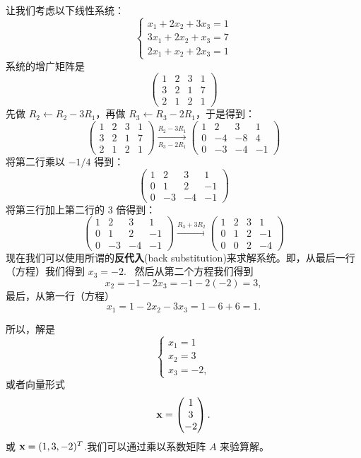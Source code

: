 让我们考虑以下线性系统：
$$
\begin{cases}
x_1 + 2x_2 + 3x_3 = 1 \\
3x_1 + 2x_2 + x_3 = 7 \\
2x_1 + x_2 + 2x_3 = 1
\end{cases}
$$
系统的增广矩阵是
$$
\left(\begin{array}{ccc|c} 1 & 2 & 3 & 1 \\ 3 & 2 & 1 & 7 \\ 2 & 1 & 2 & 1 \end{array}\right)
$$
先做 $R_2\leftarrow R_2-3R_1$，再做 $R_3\leftarrow R_3-2R_1$，于是得到：
$$
\left(\begin{array}{ccc|c} 1 & 2 & 3 & 1 \\ 3 & 2 & 1 & 7 \\ 2 & 1 & 2 & 1 \end{array}\right) \xrightarrow[R_3-2R_1]{R_2-3R_1} \left(\begin{array}{ccc|c} 1 & 2 & 3 & 1 \\ 0 & -4 & -8 & 4 \\ 0 & -3 & -4 & -1 \end{array}\right)
$$
将第二行乘以 $-1/4$ 得到：
$$
\left(\begin{array}{ccc|c} 1 & 2 & 3 & 1 \\ 0 & 1 & 2 & -1 \\ 0 & -3 & -4 & -1 \end{array}\right)
$$
将第三行加上第二行的 3 倍得到：
$$
\left(\begin{array}{ccc|c} 1 & 2 & 3 & 1 \\ 0 & 1 & 2 & -1 \\ 0 & -3 & -4 & -1 \end{array}\right) \xrightarrow{R_3+3R_2} \left(\begin{array}{ccc|c} 1 & 2 & 3 & 1 \\ 0 & 1 & 2 & -1 \\ 0 & 0 & 2 & -4 \end{array}\right)
$$
现在我们可以使用所谓的\textbf{反代入}(back substitution)来求解系统。即，从最后一行（方程）我们得到 $x_3 = -2$. ~然后从第二个方程我们得到
$$x_2 = -1 - 2x_3 = -1 - 2(-2) = 3,$$
最后，从第一行（方程）$$x_1 = 1 - 2x_2 - 3x_3 = 1 - 6 + 6 = 1.$$

所以，解是
$$\begin{cases} x_1 = 1 \\ x_2 = 3 \\ x_3 = -2 ,\end{cases}$$
或者向量形式
$$\mathbf{x} = \begin{pmatrix} 1 \\ 3 \\ -2 \end{pmatrix}.
$$
或 $\mathbf{x} = (1, 3, -2)^T$.我们可以通过乘以系数矩阵 $A$ 来验算解。

